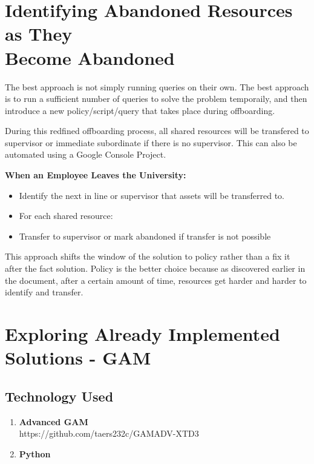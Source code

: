 \documentclass{article}
\begin{document}
\newpage
\section{Identifying Abandoned Resources as They\\ Become Abandoned}
The best approach is not simply running queries on their own. The best approach is to run a sufficient 
number of queries to solve the problem temporaily, and then introduce a new policy/script/query that takes place during offboarding.

During this redfined offboarding process, all shared resources will be transfered to supervisor or immediate subordinate if there is no supervisor.
This can also be automated using a Google Console Project.

\begin{tcolorbox}
    \textbf{When an Employee Leaves the University:}
    \begin{itemize}
        \item Identify the next in line or supervisor that assets will be transferred to.
        \item For each shared resource:
        \item Transfer to supervisor or mark abandoned if transfer is not possible 
    \end{itemize}
\end{tcolorbox}

This approach shifts the window of the solution to policy rather than a fix it after the fact solution.
Policy is the better choice because as discovered earlier in the document, after a certain amount of time, resources get harder and harder to identify and transfer.
\newpage

\section{Exploring Already Implemented Solutions - GAM}
\subsection*{Technology Used}
\begin{tcolorbox}
    \begin{enumerate}
        \item \textbf{Advanced GAM}\\https://github.com/taers232c/GAMADV-XTD3
        \item \textbf{Python}
    \end{enumerate}
\end{tcolorbox}
\end{document}
